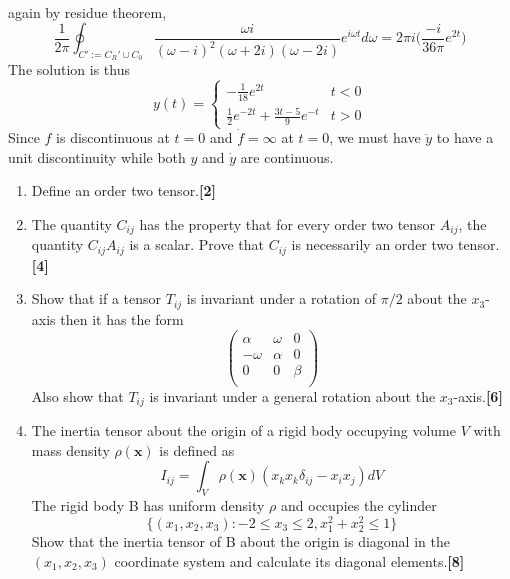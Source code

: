\documentclass[a4paper]{article}
\begin{document}
\begin{ans}
\begin{enumerate}[label=(\alph*)]
\begin{eqnarray}
\end{eqnarray}
again by residue theorem,
$$\frac{1}{2\pi}\oint_{C':=C_R'\cup C_0}\frac{\omega i}{(\omega-i)^2(\omega+2i)(\omega-2i)}e^{i\omega t}d\omega=2\pi i\bigg(\frac{-i}{36\pi}e^{2t}\bigg)$$
The solution is thus
  $$y(t)=
\left\{
        \begin{array}{ll}
      -\frac{1}{18}e^{2t} & t<0 \\
      \frac{1}{2}e^{-2t}+\frac{3t-5}{9}e^{-t} & t>0
        \end{array}
    \right.$$
Since $f$ is discontinuous at $t=0$ and $\dot{f}=\infty$ at $t=0$, we must have $\ddot{y}$ to have a unit discontinuity while both $y$ and $\dot{y}$ are continuous.
\begin{center}
\end{center}
\end{enumerate}
\end{ans}
\begin{qns}[Tensors]\leavevmode
\begin{enumerate}[label=(\alph*)]
\item Define an order two tensor.\hfill\textbf{[2]}
\item The quantity $C_{ij}$ has the property that for every order two tensor $A_{ij}$, the quantity $C_{ij}A_{ij}$ is a scalar. Prove that $C_{ij}$ is necessarily an order two tensor.\hfill\textbf{[4]}
\item Show that if a tensor $T_{ij}$ is invariant under a rotation of $\pi/2$ about the $x_3$-axis then it has the form
$$\begin{pmatrix}\alpha&\omega&0\\-\omega&\alpha&0\\0&0&\beta\\\end{pmatrix}$$
Also show that $T_{ij}$ is invariant under a general rotation about the $x_3$-axis.\hfill\textbf{[6]}
\item The inertia tensor about the origin of a rigid body occupying volume $V$ with mass density $\rho(\mathbf{x})$ is defined as
$$I_{ij}=\int_V\rho(\mathbf{x})(x_kx_k\delta_{ij}-x_ix_j)dV$$
The rigid body B has uniform density $\rho$ and occupies the cylinder
$$\{(x_1,x_2,x_3):-2\leq x_3\leq 2,x_1^2+x_2^2\leq 1\}$$
Show that the inertia tensor of B about the origin is diagonal in the $(x_1, x_2, x_3)$ coordinate system and calculate its diagonal elements.\hfill\textbf{[8]}
\end{enumerate}
\end{qns}
\end{document}
